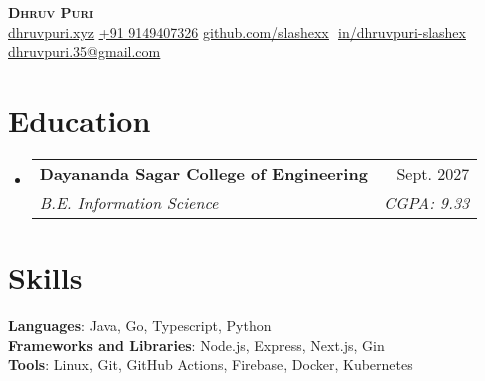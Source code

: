 \documentclass[letterpaper,11pt]{article}
\makeatletter
\newcommand{\resumeSubheading}[4]{
  \vspace{-2pt}\item
    \begin{tabular*}{0.97\textwidth}[t]{l@{\extracolsep{\fill}}r}
      \textbf{#1} & #2 \\
      \textit{\small#3} & \textit{\small #4} \\
    \end{tabular*}\vspace{-7pt}
}
\newcommand{\resumeSubHeadingListStart}{\begin{itemize}[leftmargin=0.15in, label={}]}
\newcommand{\resumeSubHeadingListEnd}{\end{itemize}}
\makeatother
\begin{document}
\begin{flushright}
  \color{gray}
  \item
\end{flushright}

\vspace{-25pt}

\begin{center}
    \textbf{\Huge \scshape Dhruv Puri} \\ \vspace{8pt}
    \small 
    \href{https://dhruvpuri.xyz/}
    {\underline{dhruvpuri.xyz}}
    \href{tel:+919149407326}
    {\underline{+91 9149407326}}
    \href{https://github.com/slashexx}{\underline{github.com/slashexx}} $  $
    \href{https://linkedin.com/in/dhruvpuri-slashex}{\underline{in/dhruvpuri-slashex}} $  $
    \href{mailto:dhruvpuri.35@gmail.com}
    {\underline{dhruvpuri.35@gmail.com}}
    
\end{center}

\section{Education}
  \resumeSubHeadingListStart
  
    \resumeSubheading
      {Dayananda Sagar College of Engineering}{Sept. 2027}
      {B.E. Information Science}{CGPA: 9.33}
  \resumeSubHeadingListEnd
\section{Skills}
 \begin{itemize}[leftmargin=0.15in, label={}]
    \small{\item{
    
     \textbf{Languages}{: Java, Go, Typescript, Python} \\
     \textbf{Frameworks and Libraries}{: Node.js, Express, Next.js, Gin} \\
     
     \textbf{Tools}{: Linux, Git, GitHub Actions, Firebase, Docker, Kubernetes}     
     
    }}
 \end{itemize}
 \vspace{-15pt}
 
\end{document}
